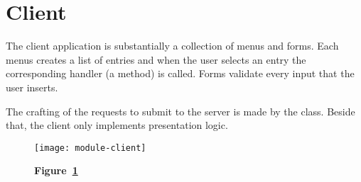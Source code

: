\section{Client}\label{sec:client}

The client application is substantially a collection of menus and forms. Each
menus creates a list of entries and when the user selects an entry the
corresponding handler (a method) is called. Forms validate every input that the
user inserts.

The crafting of the requests to submit to the server is made by the
 class. Beside that, the client only implements presentation
logic.

\begin{landscape}
	\begin{figure}[!h]
		\texttt{[image: module-client]}
		\caption*{\textbf{Figure~\ref{fig:client}}}
		\captionlistentry{}\label{fig:client}
	\end{figure}
\end{landscape}
